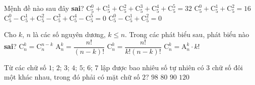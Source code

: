 \begin{ex}%
	Mệnh đề nào sau đây \textbf{sai}?
	\choice
	{$\mathrm{C}^{0}_{5} + \mathrm{C}^{1}_{5} + \mathrm{C}^{2}_{5} + \mathrm{C}^{3}_{5} + \mathrm{C}^{4}_{5} + \mathrm{C}^{5}_{5} = 32$}
	{$\mathrm{C}^{0}_{5} + \mathrm{C}^{1}_{5} + \mathrm{C}^{2}_{5} = 16$}
	{$\mathrm{C}^{0}_{5} - \mathrm{C}^{1}_{5} + \mathrm{C}^{2}_{5} - \mathrm{C}^{3}_{5} + \mathrm{C}^{4}_{5} - \mathrm{C}^{5}_{5} = 0$}
	{\True $\mathrm{C}^{0}_{5} - \mathrm{C}^{1}_{5} + \mathrm{C}^{2}_{5} = 0$}
\end{ex}

\begin{ex}%
	Cho $k$, $n$ là các số nguyên dương, $k \leq n$. Trong các phát biểu sau, phát biểu nào \textbf{sai}?
	\choice
	{$\mathrm{C}^{k}_{n} = \mathrm{C}^{n-k}_{n}$}
	{$\mathrm{A}^{k}_{n} = \dfrac{n!}{(n-k)!}$}
	{$\mathrm{C}^{k}_{n} = \dfrac{n!}{k!(n-k)!}$}
	{\True $\mathrm{C}^{k}_{n} = \mathrm{A}^{k}_{n}\cdot k!$}
\end{ex}

\begin{ex}%
	Từ các chữ số $1$; $2$; $3$; $4$; $5$; $6$; $7$ lập được bao nhiêu số tự nhiên có $3$ chữ số đôi một khác nhau, trong đó phải có mặt chữ số $2$?
	\choice
	{$98$}
	{$80$}
	{\True $90$}
	{$120$}
\end{ex}


